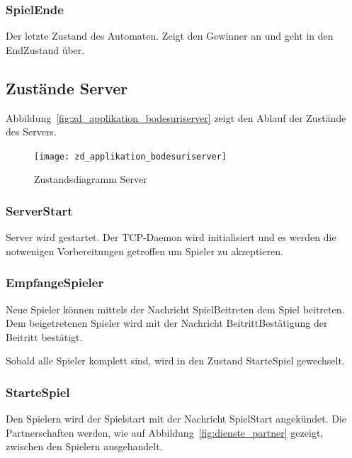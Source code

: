 \documentclass[12pt,halfparskip]{scrartcl}
\begin{document}
\subsubsection{SpielEnde} %
\label{ssub:spielende}
Der letzte Zustand des Automaten. Zeigt den Gewinner an und geht in den EndZustand über.

\subsection{Zustände Server} %
\label{sub:zustände_server}

Abbildung~\vref{fig:zd_applikation_bodesuriserver} zeigt den Ablauf der Zustände des Servers.

\begin{figure}[h]
	\centering
	\texttt{[image: zd\_applikation\_bodesuriserver]}
	\caption{Zustandsdiagramm Server}
	\label{fig:zd_applikation_bodesuriserver}
\end{figure}

\subsubsection{ServerStart} %
\label{ssub:serverStart}
Server wird gestartet. Der TCP-Daemon wird initialisiert und es werden die notwenigen Vorbereitungen getroffen um Spieler zu akzeptieren.


\subsubsection{EmpfangeSpieler} %
\label{ssub:empfangespieler}
Neue Spieler können mittels der Nachricht SpielBeitreten dem Spiel beitreten. Dem beigetretenen Spieler wird mit der Nachricht BeitrittBestätigung der Beitritt bestätigt.

Sobald alle Spieler komplett sind, wird in den Zustand StarteSpiel gewechselt.


\subsubsection{StarteSpiel} %
\label{ssub:startespiel}
Den Spielern wird der Spielstart mit der Nachricht SpielStart angekündet. Die Partnerschaften werden, wie auf Abbildung~\vref{fig:dienste_partner} gezeigt, zwischen den Spielern ausgehandelt.
\end{document}
